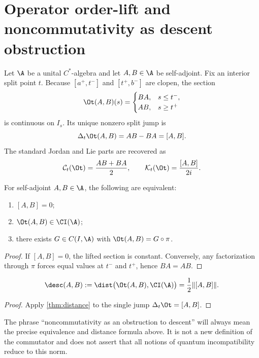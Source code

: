 \section{Operator order-lift and noncommutativity as descent obstruction}
Let $\A$ be a unital $C^*$-algebra and let $A,B\in\A$ be self-adjoint. Fix an interior split point $t$. Because $[a^+,t^-]$ and $[t^+,b^-]$ are clopen, the section
\begin{equation}\label{eq:orderlift}
\Ot(A,B)(s)=
\begin{cases}
BA,& s\le t^-,\\
AB,& s\ge t^+
\end{cases}
\end{equation}
is continuous on $I_s$. Its unique nonzero split jump is
\[
\Delta_t\Ot(A,B)=AB-BA=[A,B].
\]
The standard Jordan and Lie parts are recovered as
\begin{equation}\label{eq:jordanlie}
\mathcal C_t(\Ot)=\frac{AB+BA}{2},\qquad
\mathcal K_t(\Ot)=\frac{[A,B]}{2i}.
\end{equation}

\begin{theorem}\label{thm:commdescent}
For self-adjoint $A,B\in\A$, the following are equivalent:
\begin{enumerate}[label=(\roman*)]
\item $[A,B]=0$;
\item $\Ot(A,B)\in\CI(\A)$;
\item there exists $G\in C(I,\A)$ with $\Ot(A,B)=G\circ\pi$.
\end{enumerate}
\end{theorem}
\begin{proof}
If $[A,B]=0$, the lifted section is constant. Conversely, any factorization through $\pi$ forces equal values at $t^-$ and $t^+$, hence $BA=AB$.
\end{proof}

\begin{corollary}\label{cor:descent}
\begin{equation}\label{eq:descent}
\desc(A,B):=\dist\bigl(\Ot(A,B),\CI(\A)\bigr)=\frac12\|[A,B]\|.
\end{equation}
\end{corollary}
\begin{proof}
Apply \cref{thm:distance} to the single jump $\Delta_t\Ot=[A,B]$.
\end{proof}

The phrase ``noncommutativity as an obstruction to descent'' will always mean the precise equivalence and distance formula above. It is not a new definition of the commutator and does not assert that all notions of quantum incompatibility reduce to this norm.

